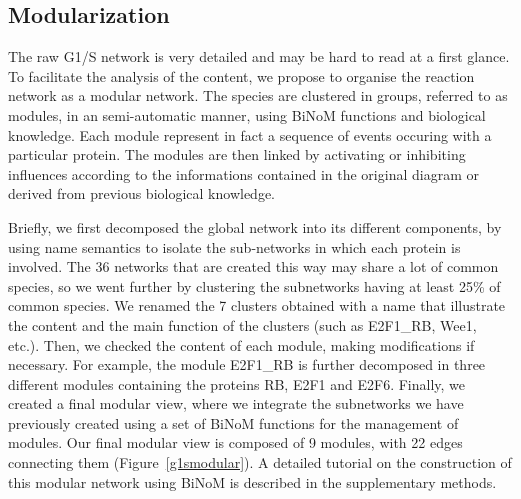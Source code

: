 \documentclass[10pt]{bmc_article}
\newenvironment{bmcformat}{\baselineskip20pt\sloppy\setboolean{publ}{false}}{\baselineskip20pt\sloppy}
\begin{document}
\begin{bmcformat}
\begin{figure}[h]
\end{figure}



\subsection*{Modularization} 

The raw G1/S network is very detailed and may be hard to read at a first glance.
To facilitate the analysis of the content, we propose to organise the reaction
network as a modular network. The species are clustered in groups, referred to
as modules, in an semi-automatic manner, using BiNoM functions and biological
knowledge. Each module represent in fact a
sequence of events occuring with a particular protein. The modules are then
linked by activating or inhibiting influences according to the informations
contained in the original diagram or derived from previous biological knowledge.

Briefly, we first decomposed the global network into its different components,
by using name semantics to isolate the sub-networks in which
each protein is involved. The 36 networks that are created this way may share a
lot of common species, so we went further
by clustering the subnetworks having at least 25\% of common species. We renamed
the 7 clusters obtained with a name that illustrate the content and the main
function of the clusters (such as E2F1\_RB, Wee1, etc.). Then, we checked the
content of each module, making modifications if necessary. For example, the
module E2F1\_RB is
further decomposed in three different modules containing the proteins RB, E2F1
and E2F6. Finally, we created a final modular view, where we integrate the
subnetworks we have previously created using a set of BiNoM functions for the
management of modules. Our final modular view is composed of 9 modules, with 22
edges connecting them (Figure~\ref{g1smodular}). A detailed tutorial on the
construction of
this modular network using BiNoM is described in the supplementary methods.



\end{bmcformat}
\end{document}
